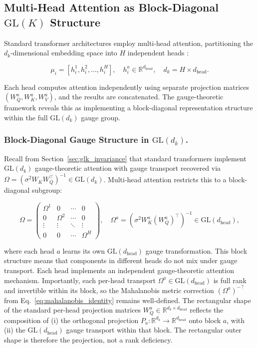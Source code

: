 \documentclass[twoside,11pt]{article}
\begin{document}
\subsection{Multi-Head Attention as Block-Diagonal $\mathrm{GL}(K)$ Structure}
\label{sec:multihead}

Standard transformer architectures employ multi-head attention, partitioning the $d_k$-dimensional embedding space into $H$ independent heads \citep{vaswani2017attention}:

\begin{equation}
\mu_i = [h_i^1, h_i^2, \ldots, h_i^H], \quad h_i^a \in \mathbb{R}^{d_{\text{head}}}, \quad d_k = H \times d_{\text{head}}.
\end{equation}

Each head computes attention independently using separate projection matrices $(W_Q^a, W_K^a, W_V^a)$, and the results are concatenated. The gauge-theoretic framework reveals this as implementing a block-diagonal representation structure within the full $\mathrm{GL}(d_k)$ gauge group.

\subsubsection{Block-Diagonal Gauge Structure in $\mathrm{GL}(d_k)$.}

Recall from Section~\ref{sec:glk_invariance} that standard transformers implement $\mathrm{GL}(d_k)$ gauge-theoretic attention with gauge transport recovered via $\Omega = (\sigma^2 W_K W_Q^\top)^{-1} \in \mathrm{GL}(d_k)$. Multi-head attention restricts this to a block-diagonal subgroup:

\begin{equation}
\Omega = \begin{pmatrix}
\Omega^1 & 0 & \cdots & 0 \\
0 & \Omega^2 & \cdots & 0 \\
\vdots & \vdots & \ddots & \vdots \\
0 & 0 & \cdots & \Omega^H
\end{pmatrix}, \quad \Omega^a = (\sigma^2 W_K^a (W_Q^a)^\top)^{-1} \in \mathrm{GL}(d_{\text{head}}),
\end{equation}

where each head $a$ learns its own $\mathrm{GL}(d_{\text{head}})$ gauge transformation. This block structure means that components in different heads do not mix under gauge transport. Each head implements an independent gauge-theoretic attention mechanism. Importantly, each per-head transport $\Omega^a \in \mathrm{GL}(d_{\text{head}})$ is full rank and invertible within its block, so the Mahalanobis metric correction $(\Omega^a)^{-\top}$ from Eq.~\eqref{eq:mahalanobis_identity} remains well-defined. The rectangular shape of the standard per-head projection matrices $W_Q^a \in \mathbb{R}^{d_k \times d_{\text{head}}}$ reflects the composition of (i) the orthogonal projection $P_a : \mathbb{R}^{d_k} \to \mathbb{R}^{d_{\text{head}}}$ onto block $a$, with (ii) the $\mathrm{GL}(d_{\text{head}})$ gauge transport within that block. The rectangular outer shape is therefore the projection, not a rank deficiency.
\end{document}
